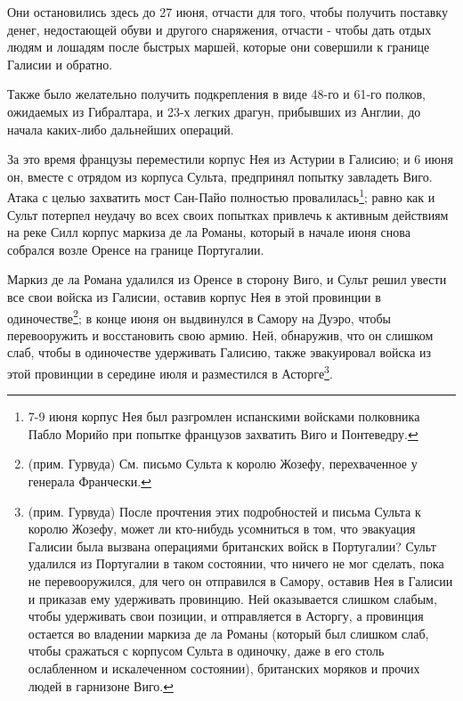 \documentclass[
  oneside,
  12pt,
  titlepage]{book}
\begin{document}
Они остановились здесь до 27 июня, отчасти для того, чтобы получить поставку денег, недостающей обуви и другого снаряжения, отчасти - чтобы дать отдых людям и лошадям после быстрых маршей, которые они совершили к границе Галисии и обратно.

Также было желательно получить подкрепления в виде 48-го и 61-го полков, ожидаемых из Гибралтара, и 23-х легких драгун, прибывших из Англии, до начала каких-либо дальнейших операций.

За это время французы переместили корпус Нея из Астурии в Галисию; и 6 июня он, вместе с отрядом из корпуса Сульта, предпринял попытку завладеть Виго. Атака с целью захватить мост Сан-Пайо полностью провалилась\footnote{7-9 июня корпус Нея был разгромлен испанскими войсками полковника Пабло Морийо при попытке французов захватить Виго и Понтеведру.}; равно как и Сульт потерпел неудачу во всех своих попытках привлечь к активным действиям на реке Силл корпус маркиза де ла Романы, который в начале июня снова собрался возле Оренсе на границе Португалии.

Маркиз де ла Романа удалился из Оренсе в сторону Виго, и Сульт решил увести все свои войска из Галисии, оставив корпус Нея в этой провинции в одиночестве\footnote{(прим. Гурвуда) См. письмо Сульта к королю Жозефу, перехваченное у генерала Франчески.}; в конце июня он выдвинулся в Самору на Дуэро, чтобы перевооружить и восстановить свою армию. Ней, обнаружив, что он слишком слаб, чтобы в одиночестве удерживать Галисию, также эвакуировал войска из этой провинции в середине июля и разместился в Асторге\footnote{(прим. Гурвуда) После прочтения этих подробностей и письма Сульта к королю Жозефу, может ли кто-нибудь усомниться в том, что эвакуация Галисии была вызвана операциями британских войск в Португалии? Сульт удалился из Португалии в таком состоянии, что ничего не мог сделать, пока не перевооружился, для чего он отправился в Самору, оставив Нея в Галисии и приказав ему удерживать провинцию. Ней оказывается слишком слабым, чтобы удерживать свои позиции, и отправляется в Асторгу, а провинция остается во владении маркиза де ла Романы (который был слишком слаб, чтобы сражаться с корпусом Сульта в одиночку, даже в его столь ослабленном и искалеченном состоянии), британских моряков и прочих людей в гарнизоне Виго.}.
\end{document}
